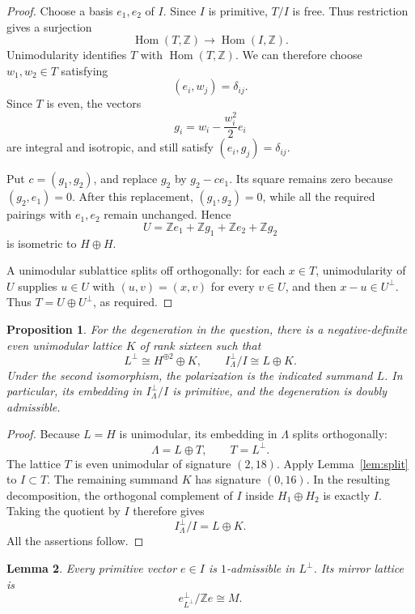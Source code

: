 \documentclass[11pt]{article}
\newcommand{\Z}{\mathbb Z}
\newtheorem{lemma}{Lemma}[section]
\newtheorem{proposition}[lemma]{Proposition}
\theoremstyle{remark}
\begin{document}
\begin{proof}
Choose a basis \(e_1,e_2\) of \(I\).
Since \(I\) is primitive, \(T/I\) is free.  Thus restriction gives a
surjection
\[
 \operatorname{Hom}(T,\Z)\longrightarrow
 \operatorname{Hom}(I,\Z).
\]
Unimodularity identifies \(T\) with \(\operatorname{Hom}(T,\Z)\).
We can therefore choose \(w_1,w_2\in T\) satisfying
\[
 (e_i,w_j)=\delta_{ij}.
\]
Since \(T\) is even, the vectors
\[
 g_i=w_i-\frac{w_i^2}{2}e_i
\]
are integral and isotropic, and still satisfy
\((e_i,g_j)=\delta_{ij}\).

Put \(c=(g_1,g_2)\), and replace \(g_2\) by \(g_2-ce_1\).
Its square remains zero because \((g_2,e_1)=0\).
After this replacement, \((g_1,g_2)=0\), while all the required
pairings with \(e_1,e_2\) remain unchanged.  Hence
\[
 U=\Z e_1+\Z g_1+\Z e_2+\Z g_2
\]
is isometric to \(H\oplus H\).

A unimodular sublattice splits off orthogonally: for each \(x\in T\),
unimodularity of \(U\) supplies \(u\in U\) with
\((u,v)=(x,v)\) for every \(v\in U\), and then \(x-u\in U^\perp\).
Thus \(T=U\oplus U^\perp\), as required.
\end{proof}

\begin{proposition}\label{prop:degeneration}
For the degeneration in the question, there is a negative-definite
even unimodular lattice \(K\) of rank sixteen such that
\[
 L^\perp\cong H^{\oplus2}\oplus K,
 \qquad
 I^\perp_\Lambda/I\cong L\oplus K.
\]
Under the second isomorphism, the polarization is the indicated
summand \(L\).  In particular, its embedding in \(I^\perp_\Lambda/I\)
is primitive, and the degeneration is doubly admissible.
\end{proposition}

\begin{proof}
Because \(L=H\) is unimodular, its embedding in \(\Lambda\) splits
orthogonally:
\[
 \Lambda=L\oplus T,
 \qquad T=L^\perp.
\]
The lattice \(T\) is even unimodular of signature \((2,18)\).
Apply Lemma~\ref{lem:split} to \(I\subset T\).
The remaining summand \(K\) has signature \((0,16)\).
In the resulting decomposition, the orthogonal complement of \(I\)
inside \(H_1\oplus H_2\) is exactly \(I\).  Taking the quotient by
\(I\) therefore gives
\[
 I^\perp_\Lambda/I=L\oplus K.
\]
All the assertions follow.
\end{proof}

\begin{lemma}\label{lem:mirror}
Every primitive vector \(e\in I\) is \(1\)-admissible in \(L^\perp\).
Its mirror lattice is
\[
 e^\perp_{L^\perp}/\Z e\cong M.
\]
\end{lemma}
\end{document}
